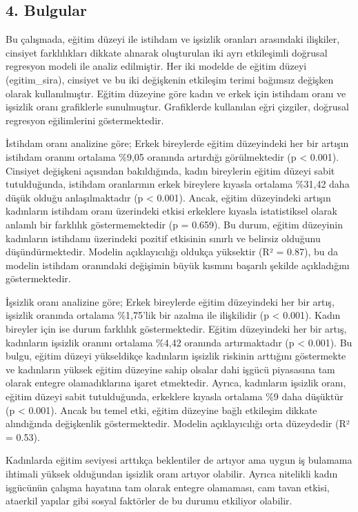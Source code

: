 \documentclass[
  11pt,
  a4paper,
  DIV=11,
  numbers=noendperiod]{scrartcl}
\begin{document}
\subsection{4. Bulgular}\label{bulgular}

Bu çalışmada, eğitim düzeyi ile istihdam ve işsizlik oranları arasındaki
ilişkiler, cinsiyet farklılıkları dikkate alınarak oluşturulan iki ayrı
etkileşimli doğrusal regresyon modeli ile analiz edilmiştir. Her iki
modelde de eğitim düzeyi (egitim\_sira), cinsiyet ve bu iki değişkenin
etkileşim terimi bağımsız değişken olarak kullanılmıştır. Eğitim
düzeyine göre kadın ve erkek için istihdam oranı ve işsizlik oranı
grafiklerle sunulmuştur. Grafiklerde kullanılan eğri çizgiler, doğrusal
regresyon eğilimlerini göstermektedir.

İstihdam oranı analizine göre; Erkek bireylerde eğitim düzeyindeki her
bir artışın istihdam oranını ortalama \%9,05 oranında artırdığı
görülmektedir (p \textless{} 0.001). Cinsiyet değişkeni açısından
bakıldığında, kadın bireylerin eğitim düzeyi sabit tutulduğunda,
istihdam oranlarının erkek bireylere kıyasla ortalama \%31,42 daha düşük
olduğu anlaşılmaktadır (p \textless{} 0.001). Ancak, eğitim düzeyindeki
artışın kadınların istihdam oranı üzerindeki etkisi erkeklere kıyasla
istatistiksel olarak anlamlı bir farklılık göstermemektedir (p = 0.659).
Bu durum, eğitim düzeyinin kadınların istihdamı üzerindeki pozitif
etkisinin sınırlı ve belirsiz olduğunu düşündürmektedir. Modelin
açıklayıcılığı oldukça yüksektir (R² = 0.87), bu da modelin istihdam
oranındaki değişimin büyük kısmını başarılı şekilde açıkladığını
göstermektedir.

İşsizlik oranı analizine göre; Erkek bireylerde eğitim düzeyindeki her
bir artış, işsizlik oranında ortalama \%1,75'lik bir azalma ile
ilişkilidir (p \textless{} 0.001). Kadın bireyler için ise durum
farklılık göstermektedir. Eğitim düzeyindeki her bir artış, kadınların
işsizlik oranını ortalama \%4,42 oranında artırmaktadır (p \textless{}
0.001). Bu bulgu, eğitim düzeyi yükseldikçe kadınların işsizlik riskinin
arttığını göstermekte ve kadınların yüksek eğitim düzeyine sahip olsalar
dahi işgücü piyasasına tam olarak entegre olamadıklarına işaret
etmektedir. Ayrıca, kadınların işsizlik oranı, eğitim düzeyi sabit
tutulduğunda, erkeklere kıyasla ortalama \%9 daha düşüktür (p
\textless{} 0.001). Ancak bu temel etki, eğitim düzeyine bağlı etkileşim
dikkate alındığında değişkenlik göstermektedir. Modelin açıklayıcılığı
orta düzeydedir (R² = 0.53).

Kadınlarda eğitim seviyesi arttıkça beklentiler de artıyor ama uygun iş
bulamama ihtimali yüksek olduğundan işsizlik oranı artıyor olabilir.
Ayrıca nitelikli kadın işgücünün çalışma hayatına tam olarak entegre
olamaması, cam tavan etkisi, ataerkil yapılar gibi sosyal faktörler de
bu durumu etkiliyor olabilir.
\end{document}
